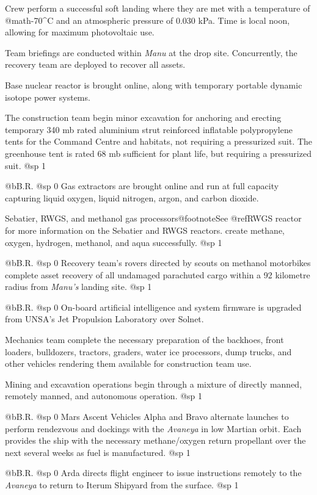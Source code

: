 Crew perform a successful soft landing where they are met with a temperature of @math{-70^{\circ}}C and an atmospheric pressure of 0.030 kPa. Time is local noon, allowing for maximum photovoltaic use.

Team briefings are conducted within {\it Manu} at the drop site. Concurrently, the recovery team are deployed to recover all assets.

Base nuclear reactor is brought online, along with temporary portable dynamic isotope power systems.

The construction team begin minor excavation for anchoring and erecting temporary 340 mb rated aluminium strut reinforced inflatable polypropylene tents for the Command Centre and habitats, not requiring a pressurized suit. The greenhouse tent is rated 68 mb sufficient for plant life, but requiring a pressurized suit.
@sp 1

@b{B.R.}
@sp 0
Gas extractors are brought online and run at full capacity capturing liquid oxygen, liquid nitrogen, argon, and carbon dioxide. 

Sebatier, RWGS, and methanol gas processors@footnote{See @ref{RWGS reactor} for more information on the Sebatier and RWGS reactors.} create methane, oxygen, hydrogen, methanol, and aqua successfully.
@sp 1

@b{B.R.}
@sp 0
Recovery team's rovers directed by scouts on methanol motorbikes complete asset recovery of all undamaged parachuted cargo within a 92 kilometre radius from {\it Manu's} landing site.
@sp 1

@b{B.R.}
@sp 0
On-board artificial intelligence and system firmware is upgraded from UNSA's Jet Propulsion Laboratory over Solnet.

Mechanics team complete the necessary preparation of the backhoes, front loaders, bulldozers, tractors, graders, water ice processors, dump trucks, and other vehicles rendering them available for construction team use.

Mining and excavation operations begin through a mixture of directly manned, remotely manned, and autonomous operation.
@sp 1

@b{B.R.}
@sp 0
Mars Ascent Vehicles Alpha and Bravo alternate launches to perform rendezvous and dockings with the {\it Avaneya} in low Martian orbit. Each provides the ship with the necessary methane/oxygen return propellant over the next several weeks as fuel is manufactured.
@sp 1

@b{B.R.}
@sp 0
Arda directs flight engineer to issue instructions remotely to the {\it Avaneya} to return to Iterum Shipyard from the surface.
@sp 1

